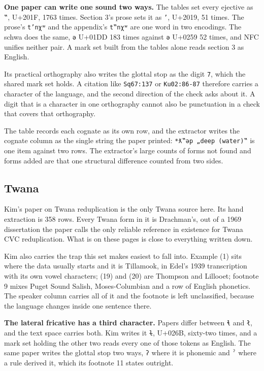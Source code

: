 \textbf{One paper can write one sound two ways.} The tables set every ejective as \texttt{‟}, U+201F, 1763 times. Section 3's prose sets it as \texttt{’}, U+2019, 51 times. The prose's \texttt{t’nχʷ} and the appendix's \texttt{t‟nχʷ} are one word in two encodings. The schwa does the same, \texttt{ǝ} U+01DD 183 times against \texttt{ə} U+0259 52 times, and NFC unifies neither pair. A mark set built from the tables alone reads section 3 as English.

Its practical orthography also writes the glottal stop as the digit \texttt{7}, which the shared mark set holds. A citation like \texttt{Sq67:137} or \texttt{Ku02:86-87} therefore carries a character of the language, and the second direction of the check asks about it. A digit that is a character in one orthography cannot also be punctuation in a check that covers that orthography.

The table records each cognate as its own row, and the extractor writes the cognate column as the single string the paper printed: \texttt{*ƛ‟ǝp „deep (water)‟} is one item against two rows. The extractor's large counts of forms not found and forms added are that one structural difference counted from two sides.

\subsection{Twana}

Kim's paper on Twana reduplication \cite{src:Kim-2017} is the only Twana source here. Its hand extraction is 358 rows. Every Twana form in it is Drachman's, out of a 1969 dissertation the paper calls the only reliable reference in existence for Twana CVC reduplication. What is on these pages is close to everything written down.

Kim also carries the trap this set makes easiest to fall into. Example (1) sits where the data usually starts and it is Tillamook, in Edel's 1939 transcription with its own vowel characters; (19) and (20) are Thompson and Lillooet; footnote 9 mixes Puget Sound Salish, Moses-Columbian and a row of English phonetics. The speaker column carries all of it and the footnote is left unclassified, because the language changes inside one sentence there.

\textbf{The lateral fricative has a third character.} Papers differ between \texttt{ɬ} and \texttt{ł}, and the text space carries both. Kim writes it \texttt{ɫ}, U+026B, sixty-two times, and a mark set holding the other two reads every one of those tokens as English. The same paper writes the glottal stop two ways, \texttt{ʔ} where it is phonemic and \texttt{ˀ} where a rule derived it, which its footnote 11 states outright.

